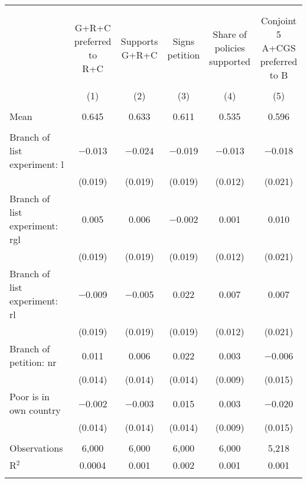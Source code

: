 
\begin{tabular}{@{\extracolsep{5pt}}lccccc} 
\\[-1.8ex]\hline 
\hline \\[-1.8ex] 
\\[-1.8ex] & \makecell{G+R+C\\preferred to\\R+C} & \makecell{Supports\\G+R+C} & \makecell{Signs\\petition} & \makecell{Share of\\policies\\supported} & \makecell{Conjoint 5\\A+CGS\\preferred to B} \\ 
\\[-1.8ex] & (1) & (2) & (3) & (4) & (5)\\ 
\hline \\[-1.8ex] 
Mean & 0.645 & 0.633 & 0.611 & 0.535 & 0.596  \\ \hline \\[-1.8ex]
 Branch of list experiment: l & $-$0.013 & $-$0.024 & $-$0.019 & $-$0.013 & $-$0.018 \\ 
  & (0.019) & (0.019) & (0.019) & (0.012) & (0.021) \\ 
  Branch of list experiment: rgl & 0.005 & 0.006 & $-$0.002 & 0.001 & 0.010 \\ 
  & (0.019) & (0.019) & (0.019) & (0.012) & (0.021) \\ 
  Branch of list experiment: rl & $-$0.009 & $-$0.005 & 0.022 & 0.007 & 0.007 \\ 
  & (0.019) & (0.019) & (0.019) & (0.012) & (0.021) \\ 
  Branch of petition: nr & 0.011 & 0.006 & 0.022 & 0.003 & $-$0.006 \\ 
  & (0.014) & (0.014) & (0.014) & (0.009) & (0.015) \\ 
  Poor is in own country & $-$0.002 & $-$0.003 & 0.015 & 0.003 & $-$0.020 \\ 
  & (0.014) & (0.014) & (0.014) & (0.009) & (0.015) \\ 
 \hline \\[-1.8ex] 

Observations & 6,000 & 6,000 & 6,000 & 6,000 & 5,218 \\ 
R$^{2}$ & 0.0004 & 0.001 & 0.002 & 0.001 & 0.001 \\ 
\hline 
\hline \\[-1.8ex] 
\end{tabular} 